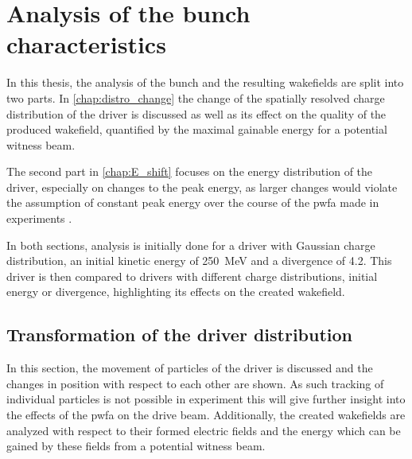 \documentclass[bachelor_thesis]{subfiles}
\begin{document}
\chapter{Analysis of the bunch characteristics}\label{chap:analysis}
In this thesis, the analysis of the bunch and the resulting wakefields are split into two parts. In \autoref{chap:distro_change} the change of the spatially resolved charge distribution of the driver is discussed as well as its effect on the quality of the produced wakefield, quantified by the maximal gainable energy for a potential witness beam.

The second part in \autoref{chap:E_shift} focuses on the energy distribution of the driver, especially on changes to the peak energy, as larger changes would violate the assumption of constant peak energy over the course of the \gls{pwfa} made in experiments \cite{Schoebel2022}.

In both sections, analysis is initially done for a driver with Gaussian charge distribution, an initial kinetic energy of \qty{250}{\MeV} and a divergence of \qty{4.2}{\mrad}. This driver is then compared to drivers with different charge distributions, initial energy or divergence,
highlighting its effects on the created wakefield. 
 
\section{Transformation of the driver distribution} \label{chap:distro_change}
In this section, the movement of particles of the driver is discussed and the changes in position with respect to each other are shown. As such tracking of individual particles is not possible in experiment
this will give further insight into the effects of the \gls{pwfa} on the drive beam. Additionally, the created wakefields are analyzed with respect to their formed electric fields and the energy which can be
gained by these fields from a potential witness beam. 
\end{document}

